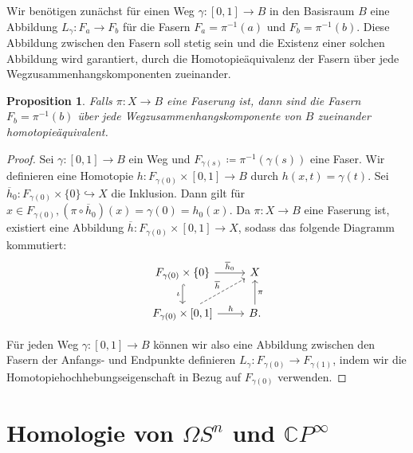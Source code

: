 \documentclass[12pt, hidelinks]{article}
\numberwithin{conj}{section}
\newtheorem{proposition}[conj]{Proposition}
\begin{document}
Wir benötigen zunächst für einen Weg $\gamma: [0,1] \to B$ in den Basisraum $B$ eine Abbildung $L_\gamma: F_a \to F_b$ für die Fasern $F_a = \pi^{-1}(a)$ und $F_b = \pi^{-1}(b)$. Diese Abbildung zwischen den Fasern soll stetig sein und die Existenz einer solchen Abbildung wird garantiert, durch die Homotopieäquivalenz der Fasern über jede Wegzusammenhangskomponenten zueinander.

\begin{proposition}
Falls $\pi: X \to B$ eine Faserung ist, dann sind die Fasern $F_b = \pi^{-1}(b)$ über jede Wegzusammenhangskomponente von $B$ zueinander homotopieäquivalent.
\end{proposition}

\begin{proof}
Sei $\gamma: [0,1] \to B$ ein Weg und $F_{\gamma(s)} \coloneq \pi^{-1}(\gamma(s))$ eine Faser. Wir definieren eine Homotopie $h: F_{\gamma(0)} \times [0,1] \to B$ durch $h(x,t) = \gamma(t)$. Sei $\overline{h}_0: F_{\gamma(0)} \times \{0\} \hookrightarrow X$ die Inklusion. Dann gilt für $x \in F_{\gamma(0)}, (\pi \circ \overline{h}_0)(x) = \gamma(0) = h_0(x)$. Da $\pi: X \to B$ eine Faserung ist, existiert eine Abbildung $\overline{h}: F_{\gamma(0)} \times [0,1] \to X$, sodass das folgende Diagramm kommutiert:
\[\begin{tikzcd}
    {F_{\gamma(0)} \times \{0\}} & X \\
    {F_{\gamma(0)}\times[0,1]} & B.
    \arrow["{\overline{h}_0}", from=1-1, to=1-2]
    \arrow["\iota"', hook, from=1-1, to=2-1]
    \arrow["{\overline{h}}", dashed, from=2-1, to=1-2]
    \arrow["h", from=2-1, to=2-2]
    \arrow["\pi"', from=2-2, to=1-2]
\end{tikzcd}\]


Für jeden Weg $\gamma: [0,1] \to B$ können wir also eine Abbildung zwischen den Fasern der Anfangs- und Endpunkte definieren $L_\gamma: F_{\gamma(0)} \to F_{\gamma(1)}$, indem wir die Homotopiehochhebungseigenschaft in Bezug auf $F_{\gamma(0)}$ verwenden.
\end{proof}

\section{Homologie von $\Omega S^n$ und $\mathbb{C}P^\infty$}

\nocite{*}
\printbibliography
\end{document}
